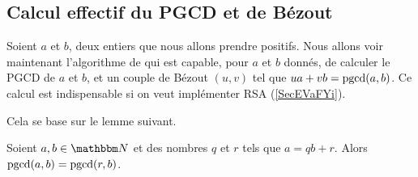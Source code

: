 \subsection{Calcul effectif du PGCD et de Bézout}
\label{subSecIpmnhO}

Soient \( a\) et \( b\), deux entiers que nous allons prendre positifs. Nous allons voir maintenant l'algorithme de  qui est capable, pour \( a\) et \( b\) donnés, de calculer le PGCD de $a$ et $b$, et un couple de Bézout \( (u,v)\) tel que \( ua+vb=\operatorname{pgcd}(a,b)\). Ce calcul est indispensable si on veut implémenter RSA (\ref{SecEVaFYi}).

Cela se base sur le lemme suivant.

\begin{lemma}       \label{LemiVqita}
    Soient \( a,b\in \eN\) et des nombres \( q\) et \( r\) tels que \( a=qb+r\). Alors \( \operatorname{pgcd}(a,b)=\operatorname{pgcd}(r,b)\).
\end{lemma}


